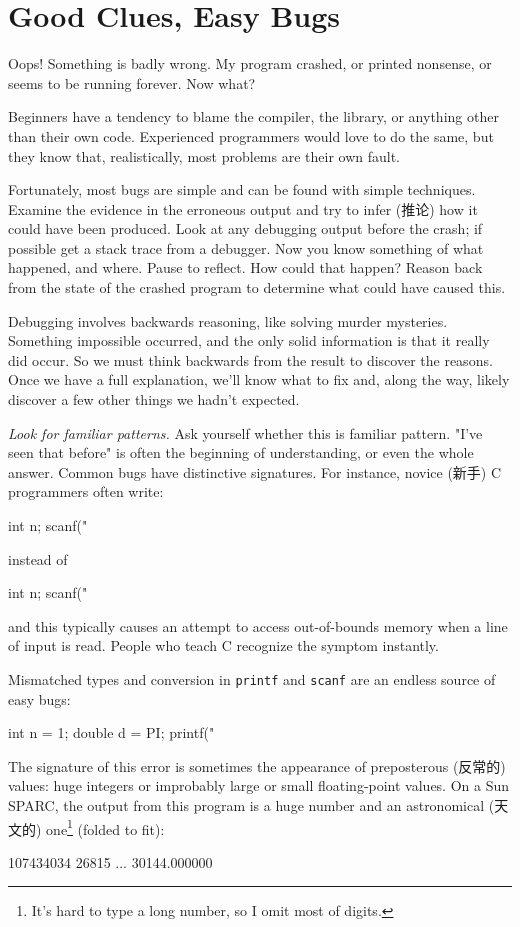 \section{Good Clues, Easy Bugs}
Oops! Something is badly wrong. My program crashed, or printed nonsense, or
seems to be running forever. Now what?

Beginners have a tendency to blame the compiler, the library, or anything
other than their own code. Experienced programmers would love to do the
same, but they know that, realistically, most problems are their own fault.

Fortunately, most bugs are simple and can be found with simple techniques.
Examine the evidence in the erroneous output and try to infer (推论) how it
could have been produced. Look at any debugging output before the crash; if
possible get a stack trace from a debugger. Now you know something of what
happened, and where. Pause to reflect. How could that happen? Reason back
from the state of the crashed program to determine what could have caused
this.

Debugging involves backwards reasoning, like solving murder mysteries.
Something impossible occurred, and the only solid information is that it
really did occur. So we must think backwards from the result to discover
the reasons. Once we have a full explanation, we'll know what to fix and,
along the way, likely discover a few other things we hadn't expected.

\emph{Look for familiar patterns.} Ask yourself whether this is familiar
pattern. "I've seen that before" is often the beginning of understanding,
or even the whole answer. Common bugs have distinctive signatures. For
instance, novice (新手) C programmers often write:
\begin{badcode}
    int n;
    scanf("%
\end{badcode}
instead of 
\begin{wellcode}
    int n;
    scanf("%
\end{wellcode}
and this typically causes an attempt to access out-of-bounds memory when a
line of input is read. People who teach C recognize the symptom instantly.

Mismatched types and conversion in \verb'printf' and \verb'scanf' are an
endless source of easy bugs:
\begin{badcode}
    int n = 1;
    double d = PI;
    printf("%
\end{badcode}
The signature of this error is sometimes the appearance of preposterous
(反常的) values: huge integers or improbably large or small floating-point
values. On a Sun SPARC, the output from this program is a huge number and
an astronomical (天文的) one\footnote{It's hard to type a long number, so I
    omit most of digits.} (folded to fit):
\begin{wellcode}
    107434034 26815 ... 30144.000000
\end{wellcode}

